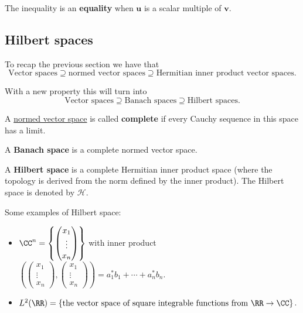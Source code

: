 \documentclass[12pt, a4paper]{article}
\begin{document}
\begin{mdremark}
    The inequality is an \textbf{equality} when \(\bm{u}\) is a scalar multiple of \(\bm{v}\).
\end{mdremark}

\subsection{Hilbert spaces}

To recap the previous section we have that 
\[\text{Vector spaces} \supseteq \text{normed vector spaces} \supseteq \text{Hermitian inner product vector spaces}.\]

With a new property this will turn into 
\[\text{Vector spaces} \supseteq \text{Banach spaces} \supseteq \text{Hilbert spaces}.\]

\begin{definition}
    A \ul{normed vector space} is called \textbf{complete} if every Cauchy sequence in this space has a limit.
\end{definition}

\begin{definition}
    A \textbf{Banach space} is a complete normed vector space.
\end{definition}

\begin{definition}
    A \textbf{Hilbert space} is a complete Hermitian inner product space (where the topology is derived from the norm defined by the inner product). The Hilbert space is denoted by \(\mathcal{H}\).
\end{definition}

\begin{mdexample}
    Some examples of Hilbert space:
    \begin{itemize}
        \item \(\CC^n = \left\{ \begin{pmatrix} x_1 \\ \vdots \\ x_n \end{pmatrix} \right\}\) with inner product \(\left( \begin{pmatrix} x_1 \\ \vdots \\ x_n \end{pmatrix}, \begin{pmatrix} x_1 \\ \vdots \\ x_n \end{pmatrix} \right) = a_1^* b_1 + \cdots + a_n^* b_n\).
        \item \(L^2(\RR) = \{\text{the vector space of square integrable functions from } \RR \to \CC\}\).
    \end{itemize}
\end{mdexample}
\end{document}
